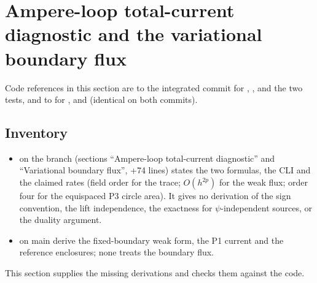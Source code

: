 \section{Ampere-loop total-current diagnostic and the variational boundary flux}
\label{sec:ampere}

Code references in this section are to the integrated commit  for ,
,  and the two tests, and to
  for ,
 and
 (identical on both
commits).

\subsection{Inventory}
\begin{itemize}
\item {} on the branch (sections ``Ampere-loop
  total-current diagnostic'' and ``Variational boundary flux'', +74 lines)
  states the two formulas, the CLI and the claimed rates (field order for the
  trace; $O(h^{2p})$ for the weak flux; order four for the equispaced P3 circle
  area). It gives no derivation of the sign convention, the lift independence,
  the exactness for $\psi$-independent sources, or the duality argument.
\item {} on main derive the
  fixed-boundary weak form, the P1 current and the reference enclosures; none
  treats the boundary flux.
\end{itemize}
This section supplies the missing derivations and checks them against the code.

